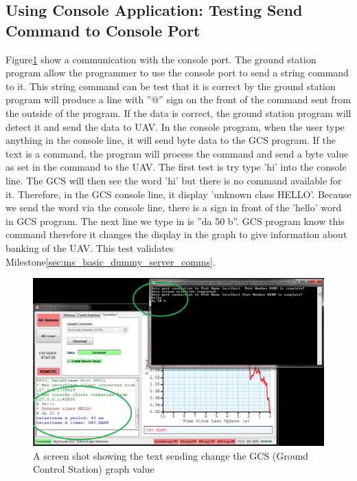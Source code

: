 \subsection{Using Console Application: Testing Send Command to Console Port}
Figure\ref{test text} show a communication with the console port.
The ground station program allow the programmer to use the console port to send a string command to it. 
This string command can be test that it is correct by the ground station program will produce a line with ''@'' sign on the front of the command sent from the outside of the program.
If the data is correct, the ground station program will detect it and send the data to UAV. 
In the console program, when the user type anything in the console line, it will send byte data to the GCS program.
If the text is a command, the program will process the command and send a byte value as set in the command to the UAV.
The first test is try type 'hi' into the console line.
The GCS will then see the word 'hi' but there is no command available for it.
Therefore, in the GCS console line, it display 'unknown class HELLO'.
Because we send the word via the console line, there is a \@ sign in front of the 'hello' word in GCS program.
The next line we type in is ''da 50 b''.
GCS program know this command therefore it changes the display in the graph to give information about banking of the UAV.
This test validates Milestone\ref{sec:ms_basic_dummy_server_comms}.
\begin{figure}[H]
\begin{center}
\includegraphics[width=1.00\textwidth]{testing_screenshots/test_sending_test_text_useful.png} 
\end{center}
\caption{A screen shot showing the text sending change the GCS (Ground Control Station) graph value\label{test text}}
\end{figure}

